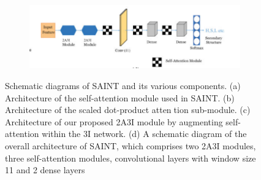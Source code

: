 \documentclass[8pt]{article}
\begin{document}
\begin{figure}[H]
\begin{subfigure}[b]{0.4\textwidth}
         \caption{}
         \label{fig:Architecture of our proposed 2A3I module}
     \end{subfigure}
     \begin{subfigure}[b]{0.4\textwidth}
         \centering
         \includegraphics[width=\textwidth]{img1_4.png}
         \caption{}
         \label{fig:overall architecture of SAINT,}
     \end{subfigure}
        \caption{ Schematic diagrams of SAINT and its various components. (a) Architecture of the self-attention module used in SAINT. (b) Architecture of the scaled dot-product attention sub-module. (c) Architecture of our proposed 2A3I module by augmenting self-attention within the 3I network. (d) A schematic diagram of the overall architecture of
SAINT, which comprises two 2A3I modules, three self-attention modules, convolutional layers with window size 11 and 2 dense layers}
        \label{fig:picture1}

\end{figure}
\end{document}

